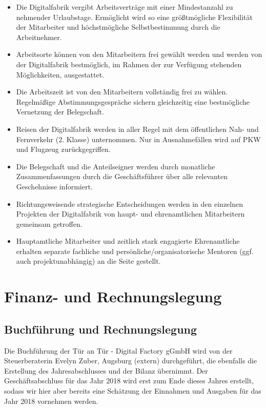 \documentclass[12pt, a4paper]{article} %
\begin{document}
\begin{itemize}
\item
Die Digitalfabrik vergibt Arbeitsverträge mit einer Mindestanzahl zu
nehmender Urlaubstage. Ermöglicht wird so eine größtmögliche
Flexibilität der Mitarbeiter und höchstmögliche Selbstbestimmung durch
die Arbeitnehmer.
\item
Arbeitsorte können von den Mitarbeitern frei gewählt werden und werden
von der Digitalfabrik bestmöglich, im Rahmen der zur Verfügung
stehenden Möglichkeiten, ausgestattet.
\item
Die Arbeitszeit ist von den Mitarbeitern vollständig frei zu wählen.
Regelmäßige Abstimmungsgespräche sichern gleichzeitig eine
bestmögliche Vernetzung der Belegschaft.
\item
Reisen der Digitalfabrik werden in aller Regel mit dem öffentlichen
Nah- und Fernverkehr (2. Klasse) unternommen. Nur in Ausnahmefällen
wird auf PKW und Flugzeug zurückgegriffen.
\item
Die Belegschaft und die Anteilseigner werden durch monatliche
Zusammenfassungen durch die Geschäftsführer über alle relevanten
Geschehnisse informiert.
\item
Richtungsweisende strategische Entscheidungen werden in den einzelnen
Projekten der Digitalfabrik von haupt- und ehrenamtlichen Mitarbeitern
gemeinsam getroffen.
\item
Hauptamtliche Mitarbeiter und zeitlich stark engagierte Ehrenamtliche
erhalten separate fachliche und persönliche/organisatorische Mentoren
(ggf. auch projektunabhängig) an die Seite gestellt.
\end{itemize}

\hypertarget{finanz--und-rechnungslegung}{%
\section{Finanz- und
Rechnungslegung}\label{finanz--und-rechnungslegung}}

\hypertarget{buchfuxfchrung-und-rechnungslegung}{%
\subsection{Buchführung und
Rechnungslegung}\label{buchfuxfchrung-und-rechnungslegung}}

Die Buchführung der Tür an Tür - Digital Factory gGmbH wird von der
Steuerberaterin Evelyn Zuber, Augsburg (extern) durchgeführt, die
ebenfalls die Erstellung des Jahresabschlusses und der Bilanz übernimmt.
Der Geschäftsabschluss für das Jahr 2018 wird erst zum Ende dieses
Jahres erstellt, sodass wir hier aber bereits eine Schätzung der
Einnahmen und Ausgaben für das Jahr 2018 vornehmen werden.
\end{document}
